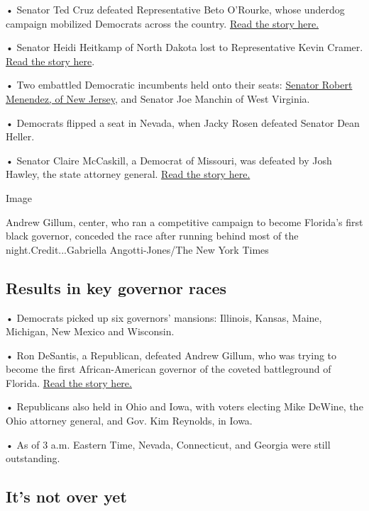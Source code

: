 • Senator Ted Cruz defeated Representative Beto O'Rourke, whose underdog
campaign mobilized Democrats across the country.
\href{https://www.nytimes.com/2018/11/06/us/ted-cruz-wins-texas-senate-race.html}{Read
the story here.}

• Senator Heidi Heitkamp of North Dakota lost to Representative Kevin
Cramer.
\href{https://www.nytimes.com/2018/11/06/us/politics/heidi-heitkamp-kevin-cramer-north-dakota.html}{Read
the story here}.

• Two embattled Democratic incumbents held onto their seats:
\href{https://www.nytimes.com/2018/11/06/nyregion/bob-menendez-wins-nj-senate.html}{Senator
Robert Menendez, of New Jersey}, and Senator Joe Manchin of West
Virginia.

• Democrats flipped a seat in Nevada, when Jacky Rosen defeated Senator
Dean Heller.

• Senator Claire McCaskill, a Democrat of Missouri, was defeated by Josh
Hawley, the state attorney general.
\href{https://www.nytimes.com/2018/11/06/us/politics/josh-hawley-claire-mccaskill-missouri.html}{Read
the story here.}

Image

Andrew Gillum, center, who ran a competitive campaign to become
Florida's first black governor, conceded the race after running behind
most of the night.Credit...Gabriella Angotti-Jones/The New York Times

\hypertarget{results-in-key-governor-races}{%
\subsection{Results in key governor
races}\label{results-in-key-governor-races}}

• Democrats picked up six governors' mansions: Illinois, Kansas, Maine,
Michigan, New Mexico and Wisconsin.

• Ron DeSantis, a Republican, defeated Andrew Gillum, who was trying to
become the first African-American governor of the coveted battleground
of Florida.
\href{https://www.nytimes.com/2018/11/06/us/florida-desantis-gillum-governor.html}{Read
the story here.}

• Republicans also held in Ohio and Iowa, with voters electing Mike
DeWine, the Ohio attorney general, and Gov. Kim Reynolds, in Iowa.

• As of 3 a.m. Eastern Time, Nevada, Connecticut, and Georgia were still
outstanding.

\hypertarget{its-not-over-yet}{%
\subsection{It's not over yet}\label{its-not-over-yet}}

